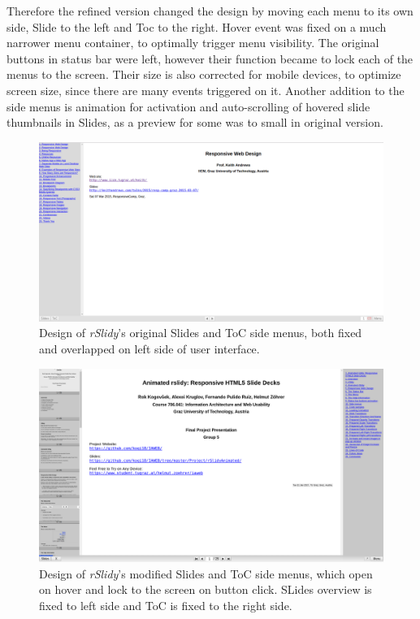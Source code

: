 Therefore the refined version changed the design by moving each menu to its own side, Slide to the left and Toc to the right. Hover event was fixed on a much narrower menu container, to optimally trigger menu visibility. The original buttons in status bar were left, however their function became to lock each of the menus to the screen. Their size is also corrected for mobile devices, to optimize screen size, since there are many events triggered on it. Another addition to the side menus is animation for activation and auto-scrolling of hovered slide thumbnails in Slides, as a preview for some was to small in original version.

\begin{figure}[tp]
	\centering
	\includegraphics[width = .9\textwidth]{images/tocOld.png}
	
	\caption[Original Side Menus]{
		Design of \textit{rSlidy}'s original Slides and ToC side menus, both fixed and overlapped on left side of user interface.
	}
	\label{fig:sideOLD}
\end{figure}
\begin{figure}[tp]
	\centering
	\includegraphics[width = .9\textwidth]{images/sidemenus.png}
	
	\caption[Modified Side Menus]{
		Design of \textit{rSlidy}'s modified Slides and ToC side menus, which open on hover and lock to the screen on button click. SLides overview is fixed to left side and ToC is fixed to the right side.
	}
	\label{fig:sideNEW}
\end{figure}

